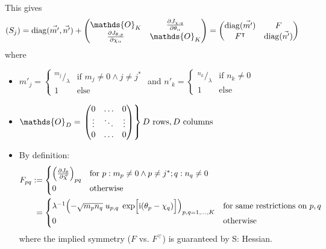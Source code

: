 \documentclass[
	english,
	a4paper,
	fontsize=10pt,
	parskip=half,
	titlepage=true,
	DIV=12,
	final
]{scrreprt}
\newcommand*{\smallfrac}  [2]{\ensuremath{{}^        {#1} \!/_        {#2}}}
\newcommand*{\transp}{\ensuremath{^\intercal}}
\newcommand*{\iunit}{\ensuremath{\mathrm{i}}}
\DeclareMathOperator{\diag}{diag}
\begin{document}
This gives 
\begin{align}
	(S_j)
&=
	\diag(\vec{m'}, \vec{n'})
	+
	\begin{pmatrix}
		\mathds{O}_{K} & 
		\pdv{J_{\chi, q}}{\theta_{\alpha}}
		\\
		\pdv{J_{\theta, p}}{\chi_{\alpha}} &
		\mathds{O}_{K}
	\end{pmatrix}
=
	\begin{pmatrix}
		\diag(\vec{m'}) & F 			\\
		F\transp & \diag(\vec{n'})
	\end{pmatrix}
\end{align}
where
\begin{itemize}
\item $m'_j = 
\begin{cases}
	\smallfrac{m_j}{\lambda}			& \text{if } m_j \neq 0 \land j \neq j^*\\
	1	& \text{else}
\end{cases}$
	and 
$n'_k =
\begin{cases}
	\smallfrac{n_k}{\lambda} 			& \text{if } n_k \neq 0 \\
	1	& \text{else}
\end{cases}$ 
\item $\mathds{O}_{D} =
	\left.
	\mqty(
		0		& \ldots		& 0 \\
		\vdots	& \ddots 	& \vdots \\
		0		& \ldots		& 0
	)
	\right\} D \text{ rows}, D \text{ columns}$
\item By definition: 
	\begin{align}
	F_{pq}
&:=
	\begin{cases}
		\qty( \pdv{J_{\theta}}{\vec{\chi}} )_{pq} 
	&
		\text{for } p : m_p \neq 0 \land p \neq j^*; q : n_q \neq 0
	\\
		0 &\text{otherwise}
	\end{cases} \\
&\;=
	\begin{cases}
		\lambda^{-1}
		\qty( -\sqrt{m_p n_q} \; u_{p,q} \; \exp[\Big. \iunit(\theta_p - \chi_q)] )_{
			\substack{p, q = 1, \ldots, K}
		}
	& 
		\text{for same restrictions on }  p, q
	\\
		0 &\text{otherwise}
	\end{cases}
	\label{eqn:defF}
	\end{align}
	where the implied symmetry ($F$ vs. $F\transp$) is guaranteed by S: Hessian.\\
\end{itemize}
\end{document}
